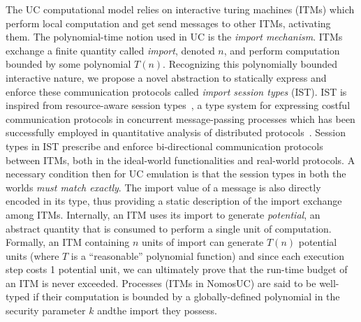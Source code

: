 The UC computational model relies on interactive turing machines (ITMs) which perform local computation and get send messages to other ITMs, activating them.
The polynomial-time notion used in UC is the \emph{import mechanism}. ITMs exchange a finite quantity called \emph{import}, denoted $n$, and perform computation bounded by some polynomial $T(n)$.
Recognizing this polynomially bounded interactive nature, we propose a novel abstraction to statically express and enforce these
communication protocols called \emph{import session types} (IST).
IST is inspired from resource-aware session types~\cite{das2018work}, a type system for expressing costful communication protocols
in concurrent message-passing processes which has been successfully employed in quantitative analysis of distributed
protocols~\cite{dasnomos,Das20FSCD,Das22LMCS,Das20arxiv}.
Session types in IST prescribe and enforce bi-directional communication protocols between ITMs, both in the ideal-world functionalities and real-world protocols.
A necessary condition then for UC emulation is that the session types in both the worlds \emph{must match exactly}.
The import value of a message is also directly encoded in its type, thus providing a static description of the import exchange
among ITMs.
Internally, an ITM uses its import to generate \emph{potential}, an abstract quantity that is consumed to perform a single
unit of computation.
Formally, an ITM containing $n$ units of import can generate $T(n)$ potential units (where $T$ is a ``reasonable'' polynomial function)
and since each execution step costs 1 potential unit, we can ultimately prove that the run-time budget of an ITM is never exceeded.
Processes (ITMs in NomosUC) are said to be well-typed if their computation is bounded by a globally-defined polynomial in the security parameter $k$ andthe import they possess.

